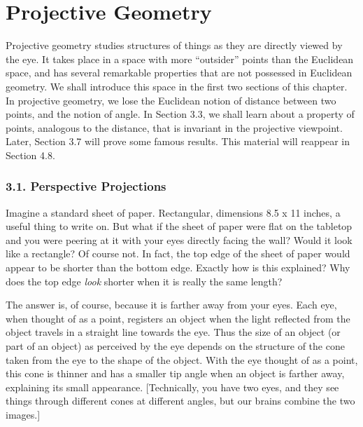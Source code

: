 \documentclass[leqno]{book}
\begin{document}
\chapter{Projective Geometry}

Projective geometry studies structures of things as they are directly viewed by the eye.  It takes place in a space with more ``outsider'' points than the Euclidean space, and has several remarkable properties that are not possessed in Euclidean geometry.  We shall introduce this space in the first two sections of this chapter.  In projective geometry, we lose the Euclidean notion of distance between two points, and the notion of angle.  In Section 3.3, we shall learn about a property of points, analogous to the distance, that is invariant in the projective viewpoint.  Later, Section 3.7 will prove some famous results.  This material will reappear in Section 4.8.

\subsection*{3.1. Perspective Projections}
Imagine a standard sheet of paper.  Rectangular, dimensions 8.5 x 11 inches, a useful thing to write on.  But what if the sheet of paper were flat on the tabletop and you were peering at it with your eyes directly facing the wall?  Would it look like a rectangle?  Of course not.  In fact, the top edge of the sheet of paper would appear to be shorter than the bottom edge.  Exactly how is this explained?  Why does the top edge \emph{look} shorter when it is really the same length?

The answer is, of course, because it is farther away from your eyes.  Each eye, when thought of as a point, registers an object when the light reflected from the object travels in a straight line towards the eye.  Thus the size of an object (or part of an object) as perceived by the eye depends on the structure of the cone taken from the eye to the shape of the object.  With the eye thought of as a point, this cone is thinner and has a smaller tip angle when an object is farther away, explaining its small appearance.  [Technically, you have two eyes, and they see things through different cones at different angles, but our brains combine the two images.]
\end{document}
